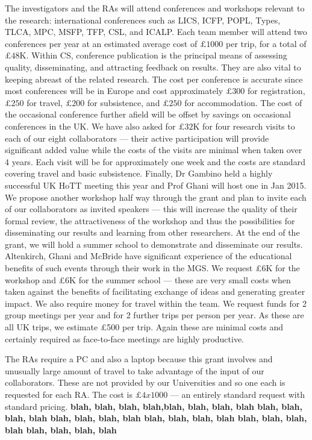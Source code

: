 \documentclass[a4paper,11pt]{article}
\begin{document}
 The investigators and the RAs will
attend conferences and workshops relevant to the research:
international conferences such as LICS, ICFP, POPL, Types, TLCA, MPC,
MSFP, TFP, CSL, and ICALP. Each team member will attend two
conferences per year at an estimated average cost of $\pounds 1000$
per trip, for a total of $\pounds 48$K. Within CS, conference
publication is the principal means of assessing quality,
disseminating, and attracting feedback on results. They are also vital
to keeping abreast of the related research. The cost per conference is
accurate since most conferences will be in Europe and cost
approximately $\pounds 300$ for registration, $\pounds 250$ for
travel, $\pounds 200$ for subsistence, and $\pounds 250$ for
accommodation. The cost of the occasional conference further afield
will be offset by savings on occasional conferences in the UK. We have
also asked for $\pounds 32$K for four research visits to each of our
eight collaborators --- their active participation will provide
significant added value while the costs of the visits are minimal when
taken over 4 years. Each visit will be for approximately one week and
the costs are standard covering travel and basic subsistence. Finally,
Dr Gambino held a highly successful UK HoTT meeting this year and Prof
Ghani will host one in Jan 2015. We propose another
workshop half way through the grant and plan to invite each of our
collaborators as invited speakers --- this will increase the quality
of their formal review, the
attractiveness of the workshop and thus the possibilities for
disseminating our results and learning from other researchers. At the
end of the grant, we will hold a summer school to demonstrate and
disseminate our results. Altenkirch, Ghani and McBride have
significant experience of the educational benefits of such 
events through their work in the MGS. We request \pounds 6K for
the workshop and \pounds 6K for the summer school --- these
are very small costs when taken against the benefits of 
facilitating exchange of ideas and generating greater
impact. We also require money for travel within the 
team. We request funds for 2 group meetings per year and for 2
further trips per person per year. As these are all UK trips, we
estimate \pounds 500 per trip. Again these are minimal costs and
certainly required as face-to-face meetings are highly productive.

\vspace{0.02in}

 The RAs require a PC and also a
laptop because this grant involves and unusually large amount of travel to take
advantage of the input of our collaborators. These are not provided by
our Universities and so one each is requested for each RA. The cost is
$\pounds 4x1000$ --- an entirely
standard request with standard pricing.
{\bf 
blah, blah, blah, blah,blah, blah, blah, blah blah, blah, blah, blah blah, blah, blah, blah blah, blah, blah, blah blah, blah, blah, blah blah, blah, blah, blah}
\end{document}
